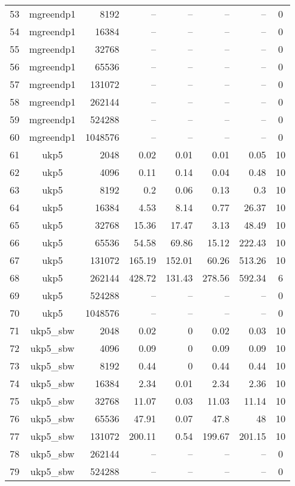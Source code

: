 \begin{longtable}{rcrrrrrc}
  53 & mgreendp1 & 8192 & -- & -- & -- & -- &   0 \\ 
  54 & mgreendp1 & 16384 & -- & -- & -- & -- &   0 \\ 
  55 & mgreendp1 & 32768 & -- & -- & -- & -- &   0 \\ 
  56 & mgreendp1 & 65536 & -- & -- & -- & -- &   0 \\ 
  57 & mgreendp1 & 131072 & -- & -- & -- & -- &   0 \\ 
  58 & mgreendp1 & 262144 & -- & -- & -- & -- &   0 \\ 
  59 & mgreendp1 & 524288 & -- & -- & -- & -- &   0 \\ 
  60 & mgreendp1 & 1048576 & -- & -- & -- & -- &   0 \\ 
  61 & ukp5 & 2048 & 0.02 & 0.01 & 0.01 & 0.05 &  10 \\ 
  62 & ukp5 & 4096 & 0.11 & 0.14 & 0.04 & 0.48 &  10 \\ 
  63 & ukp5 & 8192 & 0.2 & 0.06 & 0.13 & 0.3 &  10 \\ 
  64 & ukp5 & 16384 & 4.53 & 8.14 & 0.77 & 26.37 &  10 \\ 
  65 & ukp5 & 32768 & 15.36 & 17.47 & 3.13 & 48.49 &  10 \\ 
  66 & ukp5 & 65536 & 54.58 & 69.86 & 15.12 & 222.43 &  10 \\ 
  67 & ukp5 & 131072 & 165.19 & 152.01 & 60.26 & 513.26 &  10 \\ 
  68 & ukp5 & 262144 & 428.72 & 131.43 & 278.56 & 592.34 &   6 \\ 
  69 & ukp5 & 524288 & -- & -- & -- & -- &   0 \\ 
  70 & ukp5 & 1048576 & -- & -- & -- & -- &   0 \\ 
  71 & ukp5\_sbw & 2048 & 0.02 & 0 & 0.02 & 0.03 &  10 \\ 
  72 & ukp5\_sbw & 4096 & 0.09 & 0 & 0.09 & 0.09 &  10 \\ 
  73 & ukp5\_sbw & 8192 & 0.44 & 0 & 0.44 & 0.44 &  10 \\ 
  74 & ukp5\_sbw & 16384 & 2.34 & 0.01 & 2.34 & 2.36 &  10 \\ 
  75 & ukp5\_sbw & 32768 & 11.07 & 0.03 & 11.03 & 11.14 &  10 \\ 
  76 & ukp5\_sbw & 65536 & 47.91 & 0.07 & 47.8 & 48 &  10 \\ 
  77 & ukp5\_sbw & 131072 & 200.11 & 0.54 & 199.67 & 201.15 &  10 \\ 
  78 & ukp5\_sbw & 262144 & -- & -- & -- & -- &   0 \\ 
  79 & ukp5\_sbw & 524288 & -- & -- & -- & -- &   0 \\ 

\end{longtable}
